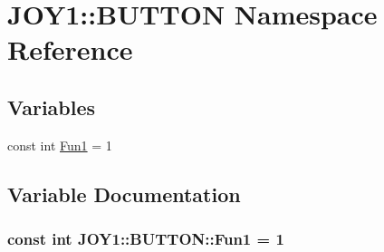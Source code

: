 \hypertarget{namespace_j_o_y1_1_1_b_u_t_t_o_n}{
\section{\-J\-O\-Y1\-:\-:\-B\-U\-T\-T\-O\-N \-Namespace \-Reference}
\label{namespace_j_o_y1_1_1_b_u_t_t_o_n}
}
\subsection*{\-Variables}
\begin{DoxyCompactItemize}
\item 
const int \hyperlink{namespace_j_o_y1_1_1_b_u_t_t_o_n_a5517444530aa0670648f48dc25189bdd}{\-Fun1} = 1
\end{DoxyCompactItemize}


\subsection{\-Variable \-Documentation}
\hypertarget{namespace_j_o_y1_1_1_b_u_t_t_o_n_a5517444530aa0670648f48dc25189bdd}{
\subsubsection[{\-Fun1}]{\setlength{\rightskip}{0pt plus 5cm}const int {\bf \-J\-O\-Y1\-::\-B\-U\-T\-T\-O\-N\-::\-Fun1} = 1}}
\label{namespace_j_o_y1_1_1_b_u_t_t_o_n_a5517444530aa0670648f48dc25189bdd}
